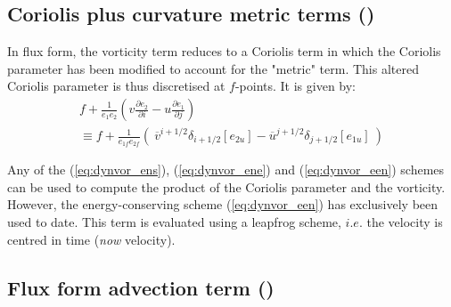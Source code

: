 \documentclass[../tex_main/NEMO_manual]{subfiles}
\begin{document}
\subsection{Coriolis plus curvature metric terms (\protect{}) }
\label{subsec:DYN_cor_flux}

In flux form, the vorticity term reduces to a Coriolis term in which the Coriolis parameter has been modified to account for the "metric" term.
This altered Coriolis parameter is thus discretised at $f$-points.
It is given by: 
\begin{multline} \label{eq:dyncor_metric}
f+\frac{1}{e_1 e_2 }\left( {v\frac{\partial e_2 }{\partial i}  -  u\frac{\partial e_1 }{\partial j}} \right)  \\
   \equiv   f + \frac{1}{e_{1f} e_{2f} } \left( { \ \overline v ^{i+1/2}\delta _{i+1/2} \left[ {e_{2u} } \right]  
                                                                 -  \overline u ^{j+1/2}\delta _{j+1/2} \left[ {e_{1u} } \right]  }  \ \right)
\end{multline} 

Any of the (\autoref{eq:dynvor_ens}), (\autoref{eq:dynvor_ene}) and (\autoref{eq:dynvor_een}) schemes can be used to
compute the product of the Coriolis parameter and the vorticity.
However, the energy-conserving scheme (\autoref{eq:dynvor_een}) has exclusively been used to date.
This term is evaluated using a leapfrog scheme, $i.e.$ the velocity is centred in time (\textit{now} velocity).

\subsection{Flux form advection term (\protect{}) }
\label{subsec:DYN_adv_flux}
\end{document}
